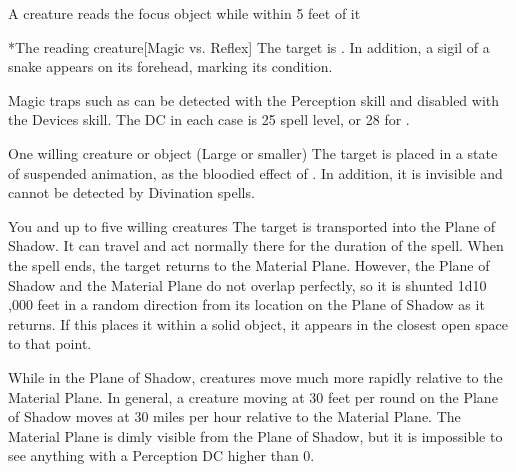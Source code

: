 \spellline
\begin{spelltrigger}{A creature reads the focus object while within 5 feet of it}
    \begin{spelltarget}*{The reading creature}[Magic vs. Reflex]
        \spellsuccess The target is \slowed. In addition, a sigil of a snake appears on its forehead, marking its condition.
    \end{spelltarget}
\end{spelltrigger}
\spellnotes Magic traps such as  can be detected with the Perception skill and disabled with the Devices skill. The DC in each case is 25 \add spell level, or 28 for .

\begin{spelltarget}{One willing creature or object (Large or smaller)}
    \spelleffect The target is placed in a state of suspended animation, as the bloodied effect of . In addition, it is invisible and cannot be detected by Divination spells.
\end{spelltarget}

\spelldur{\durext \dismissable}
\begin{spelltargets}{You and up to five willing creatures}
    \spelleffect The target is transported into the Plane of Shadow. It can travel and act normally there for the duration of the spell. When the spell ends, the target returns to the Material Plane. However, the Plane of Shadow and the Material Plane do not overlap perfectly, so it is shunted 1d10 ,000 feet in a random direction from its location on the Plane of Shadow as it returns. If this places it within a solid object, it appears in the closest open space to that point.
\end{spelltargets}
\spellnotes While in the Plane of Shadow, creatures move much more rapidly relative to the Material Plane. In general, a creature moving at 30 feet per round on the Plane of Shadow moves at 30 miles per hour relative to the Material Plane. The Material Plane is dimly visible from the Plane of Shadow, but it is impossible to see anything with a Perception DC higher than 0.


